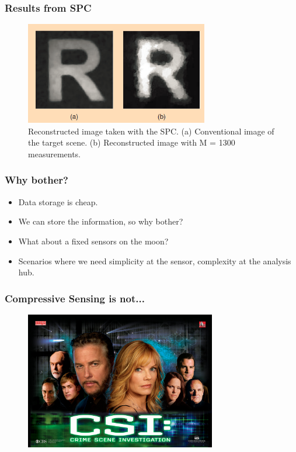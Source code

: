 \documentclass{beamer}
\begin{document}
    \begin{frame}
      \frametitle{Results from SPC}
      \begin{figure}[h]
        \centering
      \includegraphics[width = 8cm]{result1.png}
  \caption{Reconstructed image taken with the SPC. (a) Conventional image of the target scene. (b) Reconstructed image with M = 1300 measurements. }

      \end{figure}
    \end{frame}

    \begin{frame}
      \frametitle{Why bother?}
      \begin{itemize}
      \item Data storage is cheap.
        \item We can store the information, so why bother?
          \item What about a fixed sensors on the moon?
            \item Scenarios where we need simplicity at the sensor, complexity at the analysis hub. 
      \end{itemize}
    \end{frame}

  \begin{frame}
    \frametitle{Compressive Sensing is not...}
 \begin{figure}
    \href{http://www.youtube.com/watch?v=LhF_56SxrGk}
         {\includegraphics[height = 6cm]{csi}}
  \end{figure}
    
  \end{frame}
\end{document}
